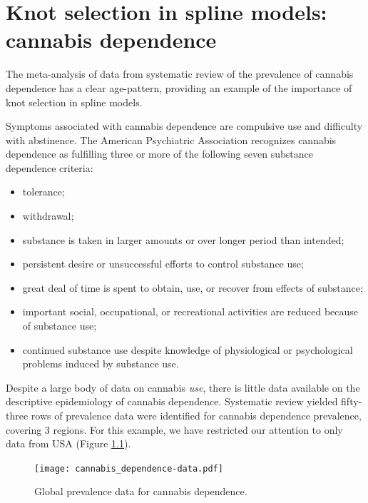\chapter{Knot selection in spline models: cannabis dependence}
\label{applications-splines_knot_loc}

The meta-analysis of data from systematic review of the prevalence of
cannabis dependence has a clear age-pattern, providing an example of
the importance of knot selection in spline models.

Symptoms associated with cannabis dependence are compulsive use and
difficulty with abstinence.  The American Psychiatric Association
recognizes cannabis dependence as fulfilling three or more of the
following seven substance dependence criteria: \cite{american_diagnostic_2000, coffey_cannabis_2002}
    \begin{itemize} \label{page:app-substance_dependence}
        \item tolerance;
        \item withdrawal;
        \item substance is taken in larger amounts or over longer
          period than intended;
        \item persistent desire or unsuccessful efforts to control
          substance use;
        \item great deal of time is spent to obtain, use, or recover
          from effects of substance;
        \item important social, occupational, or recreational
          activities are reduced because of substance use;
        \item continued substance use despite knowledge of
          physiological or psychological problems induced by substance
          use.
    \end{itemize}

Despite a large body of data on cannabis \emph{use}, there is little
data available on the descriptive epidemiology of cannabis
dependence.\cite{Degenhardt_GBDrugs_2011} Systematic review yielded
fifty-three rows of prevalence data were identified for cannabis
dependence prevalence, covering 3 regions.  For this example, we have
restricted our attention to only data from USA (Figure
\ref{fig:app-cannabis_data}).

    \begin{figure}[h]
        \begin{center}
            \texttt{[image: cannabis\_dependence-data.pdf]}
            \caption{Global prevalence data for cannabis dependence.}
            \label{fig:app-cannabis_data}
        \end{center}
    \end{figure}

